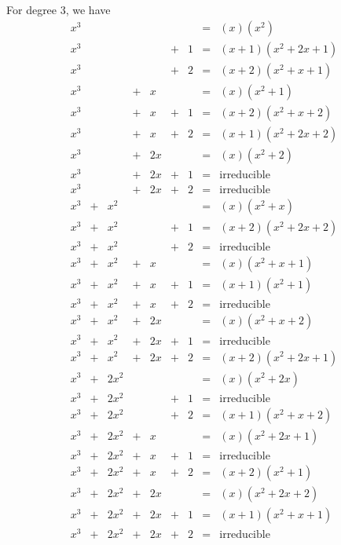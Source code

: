 For degree 3, we have
$$
\begin{array}{ccccccccl}
x^3 &   &      &   &    &   &   & = & (x)(x^2) \\
x^3 &   &      &   &    & + & 1 & = & (x+1)(x^2+2x+1) \\
x^3 &   &      &   &    & + & 2 & = & (x+2)(x^2+x+1) \\
x^3 &   &      & + &  x &   &   & = & (x)(x^2+1) \\
x^3 &   &      & + &  x & + & 1 & = & (x+2)(x^2+x+2) \\
x^3 &   &      & + &  x & + & 2 & = & (x+1)(x^2+2x+2) \\
x^3 &   &      & + & 2x &   &   & = & (x)(x^2+2) \\
x^3 &   &      & + & 2x & + & 1 & = & \mbox{irreducible} \\
x^3 &   &      & + & 2x & + & 2 & = & \mbox{irreducible} \\
x^3 & + &  x^2 &   &    &   &   & = & (x)(x^2+x) \\
x^3 & + &  x^2 &   &    & + & 1 & = & (x+2)(x^2+2x+2) \\
x^3 & + &  x^2 &   &    & + & 2 & = & \mbox{irreducible} \\
x^3 & + &  x^2 & + &  x &   &   & = & (x)(x^2+x+1) \\
x^3 & + &  x^2 & + &  x & + & 1 & = & (x+1)(x^2+1) \\
x^3 & + &  x^2 & + &  x & + & 2 & = & \mbox{irreducible} \\
x^3 & + &  x^2 & + & 2x &   &   & = & (x)(x^2+x+2) \\
x^3 & + &  x^2 & + & 2x & + & 1 & = & \mbox{irreducible} \\
x^3 & + &  x^2 & + & 2x & + & 2 & = & (x+2)(x^2+2x+1) \\
x^3 & + & 2x^2 &   &    &   &   & = & (x)(x^2+2x) \\
x^3 & + & 2x^2 &   &    & + & 1 & = & \mbox{irreducible} \\
x^3 & + & 2x^2 &   &    & + & 2 & = & (x+1)(x^2+x+2) \\
x^3 & + & 2x^2 & + &  x &   &   & = & (x)(x^2+2x+1) \\
x^3 & + & 2x^2 & + &  x & + & 1 & = & \mbox{irreducible} \\
x^3 & + & 2x^2 & + &  x & + & 2 & = & (x+2)(x^2+1) \\
x^3 & + & 2x^2 & + & 2x &   &   & = & (x)(x^2+2x+2) \\
x^3 & + & 2x^2 & + & 2x & + & 1 & = & (x+1)(x^2+x+1) \\
x^3 & + & 2x^2 & + & 2x & + & 2 & = & \mbox{irreducible} \\
\end{array}
$$


